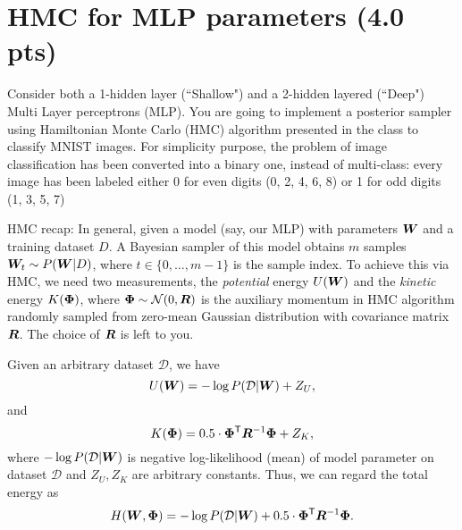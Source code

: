 
%
\newpage
\section*{%
    HMC for MLP parameters (4.0 pts)
}

%
\hfill

%
\noindent
%
Consider both a 1-hidden layer (``Shallow") and a 2-hidden layered (``Deep") Multi Layer perceptrons (MLP). You are going to implement a posterior sampler using Hamiltonian Monte Carlo (HMC) algorithm presented in the class to classify MNIST images. For simplicity purpose, the problem of image classification has been converted into a binary one, instead of multi-class: every image has been labeled either 0 for even digits (0, 2, 4, 6, 8) or 1 for odd digits (1, 3, 5, 7) 

HMC recap: In general, given a model (say, our MLP) with parameters  $\bm{W}$ and a training dataset $D$.
A Bayesian sampler of this model obtains $m$ samples $\bm{W}_{t} \sim P(\bm{W}|D)$, where $t \in \{0,\ldots,m-1\}$ is the sample index.
To achieve this via HMC, we need two measurements, the {\em potential} energy $U(\bm{W})$
and the {\em kinetic} energy $K(\bm{\Phi})$, where $\bm{\Phi} \sim \mathcal{N}(0, \bm{R})$ is the
auxiliary momentum in HMC algorithm randomly sampled from zero-mean Gaussian
distribution with covariance matrix $\bm{R}$.
The choice of $\bm{R}$ is left to you.

Given an arbitrary dataset $\mathcal{D}$, we have $$U(\bm{W}) = -\log
P(\mathcal{D}|\bm{W}) + Z_{U},$$ and $$K(\bm{\Phi}) = 0.5 \cdot \bm{\Phi}^\mathsf{T}
\bm{R}^{-1} \bm{\Phi} + Z_{K},$$ where $-\log P(\mathcal{D}|\bm{W})$ is negative
log-likelihood (mean) of model parameter on dataset $\mathcal{D}$ and $Z_{U},
Z_{K}$ are arbitrary constants.
Thus, we can regard the total energy as $$H(\bm{W}, \bm{\Phi}) = -\log
P(\mathcal{D}|\bm{W}) + 0.5 \cdot \bm{\Phi}^\mathsf{T} \bm{R}^{-1} \bm{\Phi}.$$

